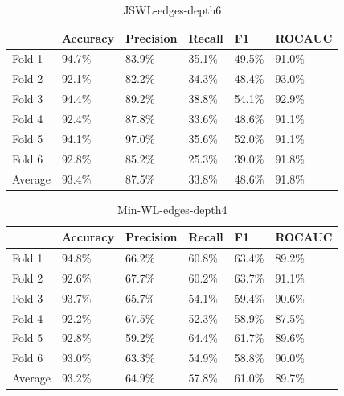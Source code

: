 \documentclass{IEEEtran}
\begin{document}
\begin{table}
    \centering
    \begin{tabular}{l||llll|l}
        \textbf{} & \textbf{Accuracy} & \textbf{Precision} & \textbf{Recall} & \textbf{F1} & \textbf{ROCAUC} \\
        \hline \hline
        Fold 1    & 94.7\%            & 83.9\%             & 35.1\%          & 49.5\%      & 91.0\%          \\
        Fold 2    & 92.1\%            & 82.2\%             & 34.3\%          & 48.4\%      & 93.0\%          \\
        Fold 3    & 94.4\%            & 89.2\%             & 38.8\%          & 54.1\%      & 92.9\%          \\
        Fold 4    & 92.4\%            & 87.8\%             & 33.6\%          & 48.6\%      & 91.1\%          \\
        Fold 5    & 94.1\%            & 97.0\%             & 35.6\%          & 52.0\%      & 91.1\%          \\
        Fold 6    & 92.8\%            & 85.2\%             & 25.3\%          & 39.0\%      & 91.8\%          \\
        \hline
        Average   & 93.4\%            & 87.5\%             & 33.8\%          & 48.6\%      & 91.8\%          \\
    \end{tabular}
    \caption{JSWL-edges-depth6}
\end{table}

\begin{table}
    \centering
    \begin{tabular}{l||llll|l}
        \textbf{} & \textbf{Accuracy} & \textbf{Precision} & \textbf{Recall} & \textbf{F1} & \textbf{ROCAUC} \\
        \hline \hline
        Fold 1    & 94.8\%            & 66.2\%             & 60.8\%          & 63.4\%      & 89.2\%          \\
        Fold 2    & 92.6\%            & 67.7\%             & 60.2\%          & 63.7\%      & 91.1\%          \\
        Fold 3    & 93.7\%            & 65.7\%             & 54.1\%          & 59.4\%      & 90.6\%          \\
        Fold 4    & 92.2\%            & 67.5\%             & 52.3\%          & 58.9\%      & 87.5\%          \\
        Fold 5    & 92.8\%            & 59.2\%             & 64.4\%          & 61.7\%      & 89.6\%          \\
        Fold 6    & 93.0\%            & 63.3\%             & 54.9\%          & 58.8\%      & 90.0\%          \\
        \hline
        Average   & 93.2\%            & 64.9\%             & 57.8\%          & 61.0\%      & 89.7\%          \\
    \end{tabular}
    \caption{Min-WL-edges-depth4}
\end{table}
\end{document}

